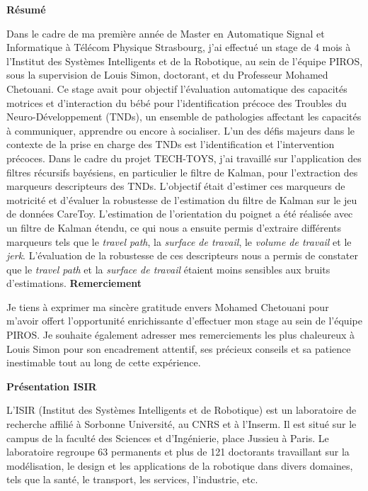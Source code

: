 \documentclass[8pt]{article}
\begin{document}
\Large \textbf{Résumé}
\par
Dans le cadre de ma première année de Master en Automatique Signal et Informatique à Télécom Physique Strasbourg, j'ai effectué un stage de 4 mois à l'Institut des Systèmes Intelligents et de la Robotique, au sein de l'équipe PIROS, sous la supervision de Louis Simon, doctorant, et du Professeur Mohamed Chetouani. Ce stage avait pour objectif l'évaluation automatique des capacités motrices et d'interaction du bébé pour l'identification précoce des Troubles du Neuro-Développement (TNDs), un ensemble de pathologies affectant les capacités à communiquer, apprendre ou encore à socialiser. L'un des défis majeurs dans le contexte de la prise en charge des TNDs est l'identification et l'intervention précoces. Dans le cadre du projet TECH-TOYS, j'ai travaillé sur l'application des filtres récursifs bayésiens, en particulier le filtre de Kalman, pour l'extraction des marqueurs descripteurs des TNDs. L'objectif était d'estimer ces marqueurs de motricité et d'évaluer la robustesse de l'estimation du filtre de Kalman sur le jeu de données CareToy. L'estimation de l'orientation du poignet a été réalisée avec un filtre de Kalman étendu, ce qui nous a ensuite permis d'extraire différents marqueurs tels que le \textit{travel path}, la \textit{surface de travail}, le \textit{volume de travail} et le \textit{jerk}. L'évaluation de la robustesse de ces descripteurs nous a permis de constater que le \textit{travel path} et la \textit{surface de travail} étaient moins sensibles aux bruits d'estimations.
\newpage
\pagestyle{empty}
\clearpage
\Large \textbf{Remerciement}
\par
Je tiens à exprimer ma sincère gratitude envers Mohamed Chetouani pour m'avoir offert l'opportunité enrichissante d'effectuer mon stage au sein de l'équipe PIROS. Je souhaite également adresser mes remerciements les plus chaleureux à Louis Simon pour son encadrement attentif, ses précieux conseils et sa patience inestimable tout au long de cette expérience.
 
\newpage
\pagestyle{empty}
\tableofcontents

\newpage
\pagestyle{empty}
\listoffigures

\newpage
\pagestyle{empty}
\clearpage
\Large \textbf{Présentation ISIR}

L'ISIR (Institut des Systèmes Intelligents et de Robotique) est un laboratoire de recherche affilié à Sorbonne Université, au CNRS et à l'Inserm. Il est situé sur le campus de la faculté des Sciences et d'Ingénierie, place Jussieu à Paris. Le laboratoire regroupe 63 permanents et plus de 121 doctorants travaillant sur la modélisation, le design et les applications de la robotique dans divers domaines, tels que la santé, le transport, les services, l'industrie, etc.
\end{document}
